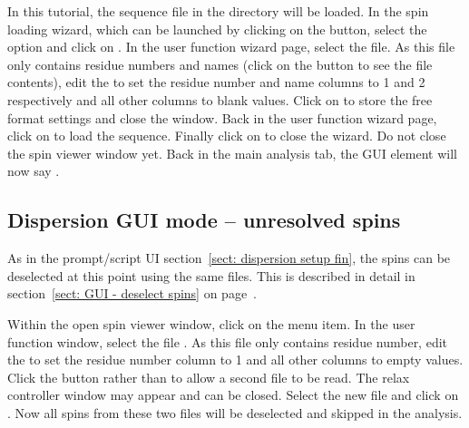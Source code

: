 In this tutorial, the sequence file  in the  directory will be loaded.
In the spin loading wizard, which can be launched by clicking on the  button, select the  option and click on .
In the  user function wizard page, select the  file.
As this file only contains residue numbers and names (click on the  button to see the file contents), edit the  to set the residue number and name columns to 1 and 2 respectively and all other columns to blank values.
Click on  to store the free format settings and close the window.
Back in the  user function wizard page, click on  to load the sequence.
Finally click on  to close the wizard.
Do not close the spin viewer window yet.
Back in the main analysis tab, the  GUI element will now say .



\subsection{Dispersion GUI mode -- unresolved spins}

As in the prompt/script UI section~\ref{sect: dispersion setup fin}, the spins can be deselected at this point using the same  files.
This is described in detail in section~\ref{sect: GUI - deselect spins} on page~\pageref{sect: GUI - deselect spins}.

Within the open spin viewer window, click on the  menu item.
In the  user function window, select the file .
As this file only contains residue number, edit the  to set the residue number column to 1 and all other columns to empty values.
Click the  button rather than  to allow a second file to be read.
The relax controller window may appear and can be closed.
Select the new file  and click on .
Now all spins from these two files will be deselected and skipped in the analysis.


